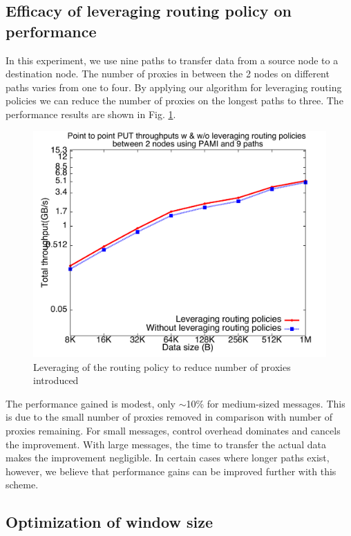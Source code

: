 \documentclass[final,5p,times]{elsarticle}
\begin{document}
\subsection{Efficacy of leveraging routing policy on performance}
In this experiment, we use nine paths to transfer data from a source node to a destination node. The number of proxies in between the 2 nodes on different paths varies from one to four. By applying our algorithm for leveraging routing policies we can reduce the number of proxies on the longest paths to three. The performance results are shown in Fig. \ref{fig:pami_shorterpaths}.

\begin{figure}[!htb]
\centering
\includegraphics[scale=0.3]{pami_shorterpaths.pdf}
\caption{Leveraging of the routing policy to reduce number of proxies introduced}
\label{fig:pami_shorterpaths}
\end{figure}

The performance gained is modest, only $\sim$10\% for medium-sized messages. This is due to the small number of proxies removed in comparison with number of proxies remaining. For small messages, control overhead dominates and cancels the improvement. With large messages, the time to transfer the actual data makes the improvement negligible. In certain cases where longer paths exist, however, we believe that performance gains can be improved further with this scheme. 


\subsection{Optimization of window size}
\end{document}
